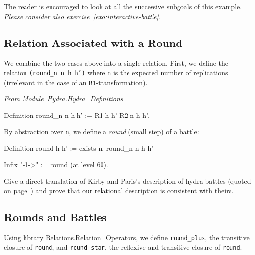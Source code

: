 The reader is encouraged to look at all the successive subgoals of this example.
\emph{Please consider also exercise~\vref{exo:interactive-battle}.}


\subsection{Relation Associated with a Round}

We combine the two cases above into a single relation.
First,  we define the  relation \texttt{(round\_n n h h')} where \texttt{n} is the expected number of  replications (irrelevant in the case of an \texttt{R1}-transformation).

\vspace{4pt}
\emph{From Module~\href{../theories/html/hydras.Hydra.Hydra_Definitions.html\#round_n}{Hydra.Hydra\_Definitions}}

\begin{Coqsrc}
Definition round_n n h h' := R1 h h' \/ R2 n h h'.  
\end{Coqsrc}

By abstraction over \texttt{n}, we define a \emph{round} (small step) of a battle:

\label{sect:infix-round}
\begin{Coqsrc}
Definition round h h' := exists n,  round_n n h h'.

Infix "-1->" := round (at level 60).
\end{Coqsrc}


\begin{project}
Give a direct translation of Kirby and Paris's description of hydra battles (quoted on page~\pageref{original-rules}) and prove that our relational description is consistent with theirs.
\end{project}


\subsection{Rounds and Battles}


Using library \href{https://coq.inria.fr/distrib/current/stdlib/Coq.Relations.Relation_Operators.html}{Relations.Relation\_Operators}, we define \texttt{round\_plus},  the transitive closure of \texttt{round}, and \texttt{round\_star},  the reflexive and transitive closure of \texttt{round}.

